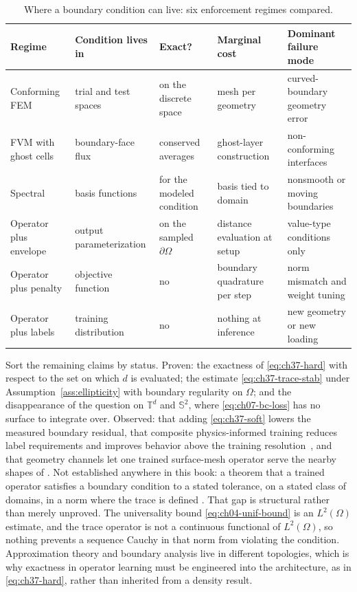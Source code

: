 \begin{table}[htbp]
\centering
\small
\caption{Where a boundary condition can live: six enforcement regimes compared.}
\label{tab:ch37-enforcement}
\begin{tabularx}{\textwidth}{@{}>{\raggedright\arraybackslash}p{}%
  >{\raggedright\arraybackslash}p{}%
  >{\raggedright\arraybackslash}p{}%
  >{\raggedright\arraybackslash}p{}%
  >{\raggedright\arraybackslash}X@{}}
\toprule
\textbf{Regime} & \textbf{Condition lives in} & \textbf{Exact?} & \textbf{Marginal cost} & \textbf{Dominant failure mode} \\
\midrule
Conforming FEM & trial and test spaces & on the discrete space & mesh per geometry & curved-boundary geometry error \\
FVM with ghost cells & boundary-face flux & conserved averages & ghost-layer construction & non-conforming interfaces \\
Spectral & basis functions & for the modeled condition & basis tied to domain & nonsmooth or moving boundaries \\
Operator plus envelope & output parameterization & on the sampled $\partial\Omega$ & distance evaluation at setup & value-type conditions only \\
Operator plus penalty & objective function & no & boundary quadrature per step & norm mismatch and weight tuning \\
Operator plus labels & training distribution & no & nothing at inference & new geometry or new loading \\
\bottomrule
\end{tabularx}
\end{table}

Sort the remaining claims by status. Proven: the exactness of
\eqref{eq:ch37-hard} with respect to the set on which $d$ is evaluated; the estimate
\eqref{eq:ch37-trace-stab} under Assumption~\ref{ass:ellipticity} with boundary regularity on
$\Omega$; and the disappearance of the question on $\mathbb{T}^d$ and $\mathbb{S}^2$, where
\eqref{eq:ch07-bc-loss} has no surface to integrate over. Observed: that adding
\eqref{eq:ch37-soft} lowers the measured boundary residual, that composite physics-informed training
reduces label requirements and improves behavior above the training resolution~\cite{li2021physics},
and that geometry channels let one trained surface-mesh operator serve the nearby shapes of
. Not established
anywhere in this book: a theorem that a trained operator satisfies a boundary condition
to a stated tolerance, on a stated class of domains, in a norm where the trace is defined
.
That gap is structural rather than merely unproved. The universality
bound \eqref{eq:ch04-unif-bound} is an $L^2(\Omega)$ estimate, and the trace operator is not a
continuous functional of $L^2(\Omega)$, so nothing prevents a sequence Cauchy in that norm from
violating the condition. Approximation theory and boundary analysis live in different
topologies, which is why exactness in operator learning must be engineered into the architecture, as
in \eqref{eq:ch37-hard}, rather than inherited from a density result.

